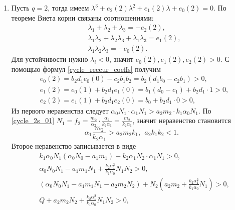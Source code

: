 \begin{enumerate}
\item Пусть \(q=2\), тогда имеем \( \lambda^3 + e_2(2) \lambda^2 + e_1(2) \lambda + e_0(2) = 0 \). По теореме Виета корни связаны соотношениями:
\begin{equation*}
    \begin{split}
        & \lambda_1 + \lambda_2 + \lambda_3 = -e_2(2), \\
        & \lambda_1 \lambda_2 + \lambda_2 \lambda_3 + \lambda_1 \lambda_3 = e_1(2), \\
        & \lambda_1 \lambda_2 \lambda_3 = -e_0(2).
    \end{split}
\end{equation*}
Для устойчивости нужно \(\lambda_i < 0\), значит \( e_0(2), e_1(2), e_2(2) > 0 \). С помощью формул \eqref{cycle_reccur_coeffs} получим
\begin{equation*}
    \begin{split}
        & e_0(2) = b_2 d_{1} e_0(0) - c_2 b_1 b_2 = b_2 ( d_{1} b_0 - c_2 b_1 ) > 0, \\
        & e_1(2) = e_0(1) + b_2 d_1 e_1(0) = b_1 (d_0 - c_1) + b_2 d_1 \cdot 1 > 0, \\
        & e_2(2) = e_1(1) + b_2 d_1 e_2(0) = b_0 + b_2 d_1 \cdot 0 > 0,
    \end{split}
\end{equation*}
Из первого неравенства следует \( \alpha_0 N_1 \cdot \alpha_1 N_1 > a_2 m_2 \cdot k_1 \alpha_0 N_1 \). По \eqref{cycle_2s_01} \(N_1 = f_2 = \frac{m_2}{\alpha_2} \cdot \frac{\alpha_2}{k_2 \alpha_1} = \frac{m_2}{k_2 \alpha_1}\), значит неравенство становится
\begin{equation*}
    \alpha_1 \frac{m_2}{k_2 \alpha_1} > a_2 m_2 k_1, ~~ a_2 k_1 k_2 < 1. 
\end{equation*}
Второе неравенство записывается в виде
\begin{equation*}
    \begin{split}
        & k_1 \alpha_0 N_1 ( \alpha_0 N_0 - a_1 m_1 ) + k_2 \alpha_1 N_2 \cdot \alpha_1 N_1 > 0, \\
        & \alpha_0 N_0 N_1 - a_1 m_1 N_1 + \frac{k_2 \alpha_1^2}{k_1 \alpha_0} N_1 N_2 > 0, \\
        & (\alpha_0 N_0 N_1 - a_1 m_1 N_1 - a_2 m_2 N_2) + N_2 ( a_2 m_2 + \frac{k_2 \alpha_1^2}{k_1 \alpha_0} N_1 ) > 0, \\
        & Q + a_2 m_2 N_2 + \frac{k_2 \alpha_1^2}{k_1 \alpha_0} N_1 N_2 > 0,
    \end{split}
\end{equation*}

\end{enumerate}
